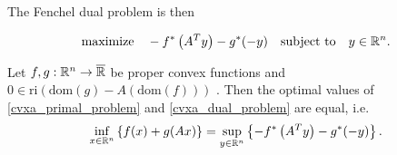 The Fenchel dual problem is then

\begin{gather}
  \label{cvxa_dual_problem}
  \text{maximize}
  \quad
  -f^* \left( A^T y \right) - g^*(-y) 
  \quad
  \text{subject to}
  \quad
  y \in \mathbb{R}^n.
\end{gather}

\begin{theorem}
  Let 
  $f, g : \mathbb{R}^n \to \overline{\mathbb{R}}$ 
  be proper convex functions
  and
  $0 \in \text{ri}(\text{dom}(g) - A (\text{dom}(f)) )$
  .
  Then the optimal values of \eqref{cvxa_primal_problem} and \eqref{cvxa_dual_problem} are equal, 
  i.e.
  \begin{gather}
    \inf_{x \in \mathbb{R}^n} 
    \left\{ f(x) + g(Ax) \right\}
    =
    \sup_{y \in \mathbb{R}^n} \left\{   -f^* \left( A^T y \right) - g^*(-y) \right\}
    .
  \end{gather}
\end{theorem}
